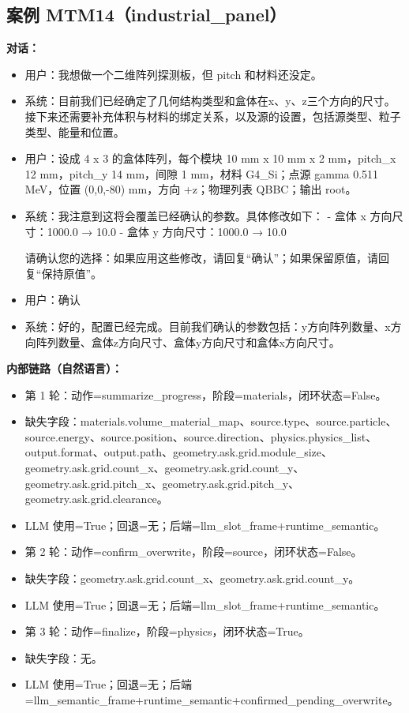 \documentclass[11pt]{ctexart}
\begin{document}
\subsection{案例 MTM14（industrial\_panel）}
\textbf{对话：}
\begin{itemize}
\item 用户：我想做一个二维阵列探测板，但 pitch 和材料还没定。
\item 系统：目前我们已经确定了几何结构类型和盒体在x、y、z三个方向的尺寸。接下来还需要补充体积与材料的绑定关系，以及源的设置，包括源类型、粒子类型、能量和位置。
\item 用户：设成 4 x 3 的盒体阵列，每个模块 10 mm x 10 mm x 2 mm，pitch\_x 12 mm，pitch\_y 14 mm，间隙 1 mm，材料 G4\_Si；点源 gamma 0.511 MeV，位置 (0,0,-80) mm，方向 +z；物理列表 QBBC；输出 root。
\item 系统：我注意到这将会覆盖已经确认的参数。具体修改如下：
- 盒体 x 方向尺寸：1000.0 → 10.0
- 盒体 y 方向尺寸：1000.0 → 10.0

请确认您的选择：如果应用这些修改，请回复“确认”；如果保留原值，请回复“保持原值”。
\item 用户：确认
\item 系统：好的，配置已经完成。目前我们确认的参数包括：y方向阵列数量、x方向阵列数量、盒体z方向尺寸、盒体y方向尺寸和盒体x方向尺寸。
\end{itemize}
\textbf{内部链路（自然语言）：}
\begin{itemize}
\item 第 1 轮：动作=summarize\_progress，阶段=materials，闭环状态=False。
\item 缺失字段：materials.volume\_material\_map、source.type、source.particle、source.energy、source.position、source.direction、physics.physics\_list、output.format、output.path、geometry.ask.grid.module\_size、geometry.ask.grid.count\_x、geometry.ask.grid.count\_y、geometry.ask.grid.pitch\_x、geometry.ask.grid.pitch\_y、geometry.ask.grid.clearance。
\item LLM 使用=True；回退=无；后端=llm\_slot\_frame+runtime\_semantic。
\item 第 2 轮：动作=confirm\_overwrite，阶段=source，闭环状态=False。
\item 缺失字段：geometry.ask.grid.count\_x、geometry.ask.grid.count\_y。
\item LLM 使用=True；回退=无；后端=llm\_slot\_frame+runtime\_semantic。
\item 第 3 轮：动作=finalize，阶段=physics，闭环状态=True。
\item 缺失字段：无。
\item LLM 使用=True；回退=无；后端=llm\_semantic\_frame+runtime\_semantic+confirmed\_pending\_overwrite。
\end{itemize}
\end{document}
